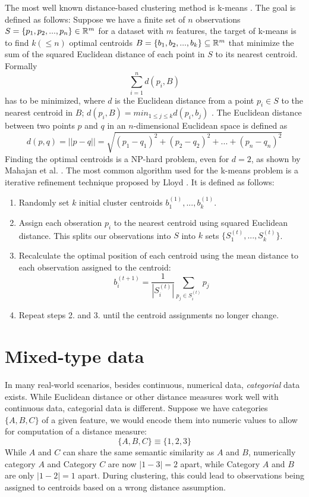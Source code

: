 The most well known distance-based clustering method is k-means \cite{kmeans}. The goal is defined as follows: Suppose we have a finite set of $n$ observations $S=\{p_1, p_2, ..., p_n\} \in \mathbb{R}^m$ for a dataset with $m$ features, the target of k-means is to find $k (\leq n)$ optimal centroids $B=\{b_1, b_2, ..., b_k\} \subseteq \mathbb{R}^m$ that minimize the sum of the squared Euclidean distance of each point in $S$ to its nearest centroid. Formally
$$\sum_{i=1}^n  d(p_i, B)$$
has to be minimized, where $d$ is the Euclidean distance from a point $p_i \in S$ to the nearest centroid in $B$; $d(p_i, B) = min_{1 \leq j \leq k} d(p_i, b_j)$ \cite{kmeans_np_hard}. The Euclidean distance between two points $p$ and $q$ in an $n$-dimensional Euclidean space is defined as 
$$d(p, q) = || p - q || = \sqrt{(p_1 - q_1)^2 + (p_2 - q_2)^2 + ... + (p_n - q_n)^2}$$
Finding the optimal centroids is a NP-hard problem, even for $d=2$, as shown by Mahajan et al. \cite{kmeans_np_hard}. The most common algorithm used for the k-means problem is a iterative refinement technique proposed by Lloyd \cite{kmeans_lloyd}. It is defined as follows:
\begin{enumerate} 
	\item Randomly set $k$ initial cluster centroids $b_1^{(1)}, ..., b_k^{(1)}$.
	\item Assign each obseration $p_i$ to the nearest centroid using squared Euclidean distance. This splits our observations into $S$ into $k$ sets $\{S_1^{(t)}, ..., S_k^{(t)}\}$.
	\item Recalculate the optimal position of each centroid using the mean distance to each observation assigned to the centroid: 
$$b_i^{(t+1)} = \frac{1}{|S_i^{(t)}|} \sum_{p_j \in S_i^{(t)}} p_j$$
	\item Repeat steps 2. and 3. until the centroid assignments no longer change.
\end{enumerate}

\section{Mixed-type data}

In many real-world scenarios, besides continuous, numerical data, \textit{categorial} data exists. While Euclidean distance or other distance measures work well with continuous data, categorial data is different. Suppose we have categories $\{A, B, C\}$ of a given feature, we would encode them into numeric values to allow for computation of a distance measure:
$$\{A, B, C\} \equiv \{1, 2, 3\}$$
While $A$ and $C$ can share the same semantic similarity as $A$ and $B$, numerically category $A$ and Category $C$ are now $|1-3| = 2$ apart, while Category $A$ and $B$ are only $|1-2|=1$ apart. During clustering, this could lead to observations being assigned to centroids based on a wrong distance assumption.

